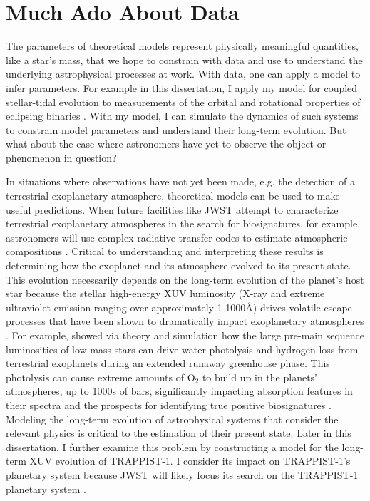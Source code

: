 \section{Much Ado About Data}

The parameters of theoretical models represent physically meaningful quantities, like a star's mass, that we hope to constrain with data and use to understand the underlying astrophysical processes at work. With data, one can apply a model to infer parameters. For example in this dissertation, I apply my model for coupled stellar-tidal evolution to measurements of the orbital and rotational properties of \kepler eclipsing binaries \citep[e.g.][]{McQuillan2014,Lurie2017}. With my model, I can simulate the dynamics of such systems to constrain model parameters and understand their long-term evolution. But what about the case where astronomers have yet to observe the object or phenomenon in question?

In situations where observations have not yet been made, e.g. the detection of a terrestrial exoplanetary atmosphere, theoretical models can be used to make useful predictions.  When future facilities like JWST attempt to characterize terrestrial exoplanetary atmospheres in the search for biosignatures, for example, astronomers will use complex radiative transfer codes to estimate atmospheric compositions \citep[e.g. SMART,][]{Meadows1996,Crisp1997}. Critical to understanding and interpreting these results is determining how the exoplanet and its atmosphere evolved to its present state. This evolution necessarily depends on the long-term evolution of the planet's host star because the stellar high-energy XUV luminosity (X-ray and extreme ultraviolet emission ranging over approximately 1-1000\AA) drives volatile escape processes that have been shown to dramatically impact exoplanetary atmospheres \citep{Watson1981,Lammer2003,MurrayClay2009}. For example, \citet{Luger2015} showed via theory and simulation how the large pre-main sequence luminosities of low-mass stars can drive water photolysis and hydrogen loss from terrestrial exoplanets during an extended runaway greenhouse phase. This photolysis can cause extreme amounts of O$_2$ to build up in the planets' atmospheres, up to 1000s of bars, significantly impacting absorption features in their spectra and the prospects for identifying true positive biosignatures \citep[see][]{Meadows2017,Meadows2018}. Modeling the long-term evolution of astrophysical systems that consider the relevant physics is critical to the estimation of their present state. Later in this dissertation, I further examine this problem by constructing a model for the long-term XUV evolution of TRAPPIST-1. I consider its impact on TRAPPIST-1's planetary system because JWST will likely focus its search on the TRAPPIST-1 planetary system \citep{Morley2017,Lincowski2018,Lustig2019}. 

